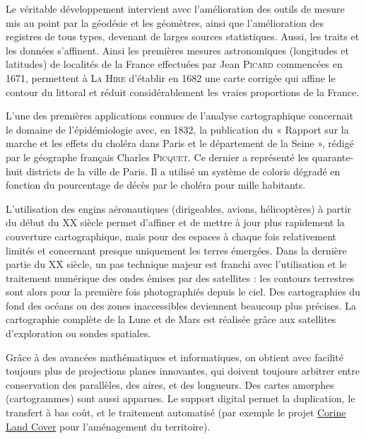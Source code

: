 Le véritable développement intervient avec l'amélioration des outils de mesure mis au point par la géodésie et les géomètres, ainsi que l'amélioration des registres de tous types, devenant de larges sources statistiques. Aussi, les traits et les données s'affinent. Ainsi les premières mesures astronomiques (longitudes et latitudes) de localités de la France effectuées par Jean \textsc{Picard} commencées en 1671, permettent à \textsc{La Hire} d'établir en 1682 une carte corrigée qui affine le contour du littoral et réduit considérablement les vraies proportions de la France.

%
L’une des premières applications connues de l’analyse cartographi\-que concernait le domaine de l’épidémiologie avec, en 1832, la publication du « Rapport sur la marche et les effets du choléra dans Paris et le département de la Seine », rédigé par le géographe français Charles \textsc{Picquet}. Ce dernier a représenté les quarante-huit districts de la ville de Paris. Il a utilisé un système de coloris dégradé en fonction du pourcentage de décès par le choléra pour mille habitants.

L'utilisation des engins aéronautiques (dirigeables, avions, hélicoptères) à partir du début du XX siècle permet d'affiner et de mettre à jour plus rapidement la couverture cartographique, mais pour des espaces à chaque fois relativement limités et concernant presque uniquement les terres émergées. Dans la dernière partie du XX siècle, un pas technique majeur est franchi avec l'utilisation et le traitement numérique des ondes émises par des satellites : les contours terrestres sont alors pour la première fois photographiés depuis le ciel. Des cartographies du fond des océans ou des zones inaccessibles deviennent beaucoup plus précises. La cartographie complète de la Lune et de Mars est réalisée grâce aux satellites d'exploration ou sondes spatiales. 

Grâce à des avancées mathématiques et informatiques, on obtient avec facilité toujours plus de projections planes innovantes, qui doivent toujours arbitrer entre conservation des parallèles, des aires, et des longueurs. Des cartes amorphes (cartogrammes) sont aussi apparues. Le support digital permet la duplication, le transfert à bas coût, et le traitement automatisé (par exemple le projet \href{https://fr.wikipedia.org/wiki/Corine_Land_Cover}{Corine Land Cover} pour l'aménagement du territoire).

